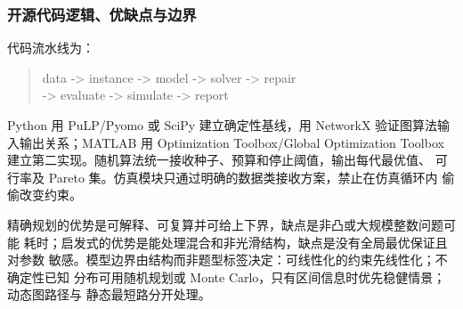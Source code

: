 \subsubsection{开源代码逻辑、优缺点与边界}

代码流水线为：
\begin{quote}
\small\ttfamily
data -> instance -> model -> solver -> repair\\
-> evaluate -> simulate -> report
\end{quote}
Python 用 PuLP/Pyomo 或 SciPy 建立确定性基线，用
NetworkX 验证图算法输入输出关系；MATLAB 用 Optimization Toolbox/Global Optimization
Toolbox 建立第二实现。随机算法统一接收种子、预算和停止阈值，输出每代最优值、
可行率及 Pareto 集。仿真模块只通过明确的数据类接收方案，禁止在仿真循环内
偷偷改变约束。

精确规划的优势是可解释、可复算并可给上下界，缺点是非凸或大规模整数问题可能
耗时；启发式的优势是能处理混合和非光滑结构，缺点是没有全局最优保证且对参数
敏感。模型边界由结构而非题型标签决定：可线性化的约束先线性化；不确定性已知
分布可用随机规划或 Monte Carlo，只有区间信息时优先稳健情景；动态图路径与
静态最短路分开处理。

